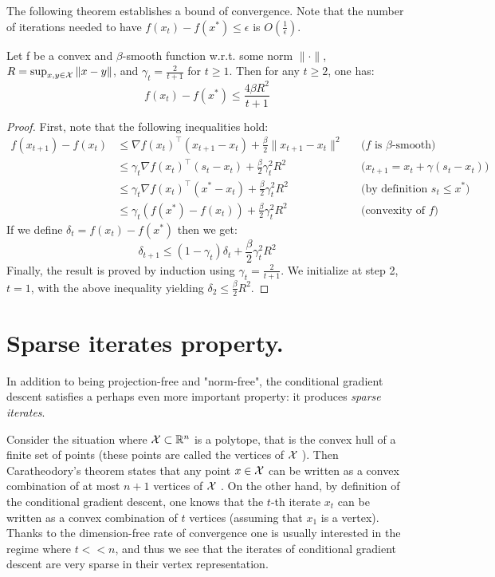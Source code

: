 The following theorem establishes a bound of convergence. Note that the number of iterations needed to have $f(x_t)-f(x^*) \leq \epsilon$  is $O(\frac{1}{\epsilon})$.

\begin{theorem}
Let f be a convex and $\beta$-smooth function w.r.t. some norm $\|\cdot\|$, $R=\sup_{x,y \in \mathcal{X}} \| x-y \|$, and $\gamma_t=\frac{2}{t+1}$ for $t \geq 1$. Then for any $t\geq2$, one has:
\begin{equation}
f(x_t)-f(x^*) \leq \frac{4 \beta R^2 }{t+1}
\end{equation}
\end{theorem}

\begin{proof}
First, note that the following inequalities hold:
  \begin{align}
    f(x_{t+1})-f(x_t) & \leq \nabla f(x_t)^\top (x_{t+1}-x_{t}) + \frac{\beta}{2} \| x_{t+1}-x_{t} \|^2 \nonumber && \text{($f$ is $\beta$-smooth)} \\
    & \leq \gamma_t \nabla f(x_t)^\top (s_{t}-x_{t}) + \frac{\beta}{2} \gamma_t^2 R^2 \nonumber && \text{($x_{t+1}=x_t+\gamma (s_t-x_t)$)} \\
    & \leq \gamma_t \nabla f(x_t)^\top (x^*-x_t) + \frac{\beta}{2} \gamma_t^2 R^2 \nonumber && \text{(by definition $s_t \leq x^*$)} \\
    & \leq \gamma_t ( f(x^*)-f(x_t)) + \frac{\beta}{2} \gamma_t^2 R^2 \nonumber && \text{(convexity of $f$)}
  \end{align}
If we define $\delta_t = f(x_t)-f(x^*)$ then we get:
\begin{equation}
\delta_{t+1} \leq (1-\gamma_t)\delta_t+\frac{\beta}{2} \gamma_t^2 R^2
\end{equation}
Finally, the result is proved by induction using $\gamma_t =\frac{2}{t+1}$. We initialize at step 2, $t=1$, with the above inequality yielding $\delta_2 \leq \frac{\beta}{2} R^2$.
\end{proof}

\section{Sparse iterates property.}
In addition to being projection-free and "norm-free", the conditional gradient descent satisfies a perhaps even more important property: it produces \emph{sparse iterates}.

Consider the situation where $\mathcal{X} \subset \mathbb{R}^n$ is a polytope, that is the convex hull of a finite set of points (these points are called the vertices of $\mathcal{X}$ ). Then Caratheodory's theorem states that any point $x \in \mathcal{X}$ can be written as a convex combination of at most $n+1$ vertices of $\mathcal{X}$ . On the other hand, by definition of the conditional gradient descent, one knows that the $t$-th iterate $x_t$ can be written as a convex combination of $t$ vertices (assuming that $x_1$ is a vertex). Thanks to the dimension-free rate of convergence one is usually interested in the regime where $t<<n$, and thus we see that the iterates of conditional gradient descent are very sparse in their vertex representation.

